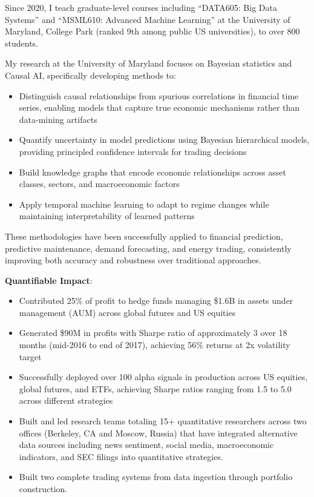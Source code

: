 \documentclass[11pt, letterpaper]{article}
\begin{document}
  Since 2020, I teach graduate-level courses including ``DATA605:
  Big Data Systems'' and ``MSML610: Advanced Machine Learning'' at the
  University of Maryland, College Park (ranked 9th among public US
  universities), to over 800 students.

  My research at the University of Maryland focuses on Bayesian statistics and
  Causal AI, specifically developing methods to:

  \begin{itemize}
    \item Distinguish causal relationships from spurious correlations in
      financial time series, enabling models that capture true economic
      mechanisms rather than data-mining artifacts

    \item Quantify uncertainty in model predictions using Bayesian hierarchical
      models, providing principled confidence intervals for trading decisions

    \item Build knowledge graphs that encode economic relationships across
      asset classes, sectors, and macroeconomic factors

    \item Apply temporal machine learning to adapt to regime changes while
      maintaining interpretability of learned patterns
  \end{itemize}

  These methodologies have been successfully applied to financial prediction,
  predictive maintenance, demand forecasting, and energy trading, consistently
  improving both accuracy and robustness over traditional approaches.

  \textbf{Quantifiable Impact}:

  \begin{itemize}
    \item Contributed 25\% of profit to hedge funds managing \$1.6B in assets
      under management (AUM) across global futures and US equities

    \item Generated \$90M in profits with Sharpe ratio of approximately 3
      over 18 months (mid-2016 to end of 2017), achieving 56\% returns at
      2x volatility target

    \item Successfully deployed over 100 alpha signals in production across
      US equities, global futures, and ETFs, achieving Sharpe ratios ranging
      from 1.5 to 5.0 across different strategies

    \item Built and led research teams totaling 15+ quantitative researchers
      across two offices (Berkeley, CA and Moscow, Russia) that have integrated
      alternative data sources including news sentiment, social media,
      macroeconomic indicators, and SEC filings into quantitative strategies.

    \item Built two complete trading systems from data ingestion through
      portfolio construction.
  \end{itemize}
\end{document}
